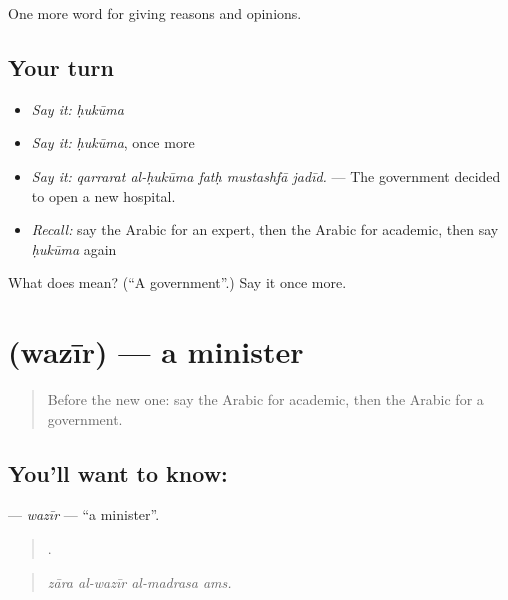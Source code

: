 \begin{grammarlens}[title={What you've built}]
One more word for giving reasons and opinions.
\end{grammarlens}

\subsection*{Your turn}
\begin{itemize}
\raggedright
  \item \emph{Say it:} \emph{ḥukūma}
  \item \emph{Say it:} \emph{ḥukūma}, once more
  \item \emph{Say it:} \emph{qarrarat al-ḥukūma fatḥ mustashfā jadīd.} — The government decided to open a new hospital.
  \item \emph{Recall:} say the Arabic for an expert, then the Arabic for academic, then say \emph{ḥukūma} again
\end{itemize}

\begin{tcolorbox}[breakable,colback=teal!4,colframe=teal!35!black,title={Before you move on}]
What does  mean? (\textquotedblleft{}A government\textquotedblright{}.) Say it once more.
\end{tcolorbox}
\section[\texorpdfstring{\ar{وزير} (wazīr)}{وزير (wazīr)}]{ (wazīr) — a minister}

\label{lesson:AR-C377-wazir}



\begin{quote}
Before the new one: say the Arabic for academic, then the Arabic for a government.
\end{quote}

\subsection*{You'll want to know: }
\textbf{} — \emph{wazīr} — \textquotedblleft{}a minister\textquotedblright{}.

\begin{quote}
   .
\end{quote}

\begin{quote}
\emph{zāra al-wazīr al-madrasa ams.}
\end{quote}

